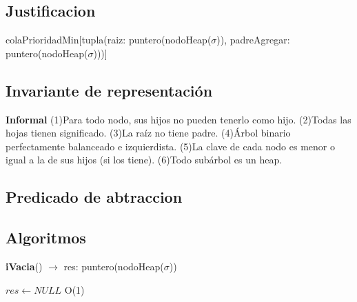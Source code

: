 \begin{Representacion}
\subsection{Justificacion}
	\begin{Estructura}{colaPrioridadMin}[tupla(raiz: puntero(nodoHeap($\sigma$)), padreAgregar: puntero(nodoHeap($\sigma$)))]
		\begin{Tupla}[nodoHeap]
		\end{Tupla}
	\end{Estructura}
\subsection{Invariante de representación}

\textbf{Informal}
(1)Para todo nodo, sus hijos no pueden tenerlo como hijo.
(2)Todas las hojas tienen significado.
(3)La raíz no tiene padre.
(4)Árbol binario perfectamente balanceado e izquierdista.
(5)La clave de cada nodo es menor o igual a la de sus hijos (si los tiene).
(6)Todo subárbol es un heap.

\subsection{Predicado de abtraccion}




\subsection{Algoritmos}

\begin{Algoritmos}

\begin{algorithm}[H]{\textbf{iVacia}() $\to$ res: puntero(nodoHeap($\sigma$))}
	\begin{algorithmic}[1]
		\State $res \gets NULL$ \Comment O(1)
		

\end{algorithmic}
\end{algorithm}
\end{Algoritmos}
\end{Representacion}
